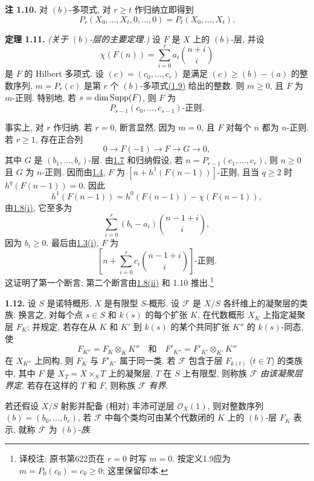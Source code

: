 \textbf{注 1.10.} 对 \((b)\)-多项式, 对 \(r\geq t\) 作归纳立即得到
\[
  P_r(X_0,\ldots,X_t,0,\ldots,0)=P_t(X_0,\ldots,X_t).
\]

\textbf{定理 1.11.} \emph{(关于 \((b)\)-层的主要定理.)} 设 \(F\) 是 \(X\) 上的 \((b)\)-层, 并设
\[
  \chi(F(n))=\sum_{i=0}^{r}a_i\binom{n+i}{i}
\]
是 \(F\) 的 Hilbert 多项式. 设 \((c)=(c_0,\ldots,c_r)\) 是满足 \((c)\geq(b)-(a)\) 的整数序列, \(m=P_r(c)\) 是第 \(r\) 个 \((b)\)-多项式\hyperlink{sga6.e13.def.1-9}{(1.9)} 给出的整数. 则 \(m\geq0\), 且 \(F\) 为 \(m\)-正则. 特别地, 若 \(s=\dim\operatorname{Supp}(F)\), 则 \(F\) 为
\[
  P_{s-1}(c_0,\ldots,c_{s-1})\text{-正则}.
\]

事实上, 对 \(r\) 作归纳. 若 \(r=0\), 断言显然, 因为 \(m=0\), 且 \(F\) 对每个 \(n\) 都为 \(n\)-正则. 若 \(r\geq1\), 存在正合列
\[
  0\longrightarrow F(-1)\longrightarrow F\longrightarrow G\longrightarrow0,
\]
其中 \(G\) 是 \((b_1,\ldots,b_r)\)-层. 由\hyperlink{sga6.e13.lem.1-7}{1.7} 和归纳假设, 若 \(n=P_{r-1}(c_1,\ldots,c_r)\), 则 \(n\geq0\) 且 \(G\) 为 \(n\)-正则. 因而由\hyperlink{sga6.e13.prop.1-4}{1.4}, \(F\) 为 \([n+h^1(F(n-1))]\)-正则, 且当 \(q\geq2\) 时 \(h^q(F(n-1))=0\). 因此
\[
  h^1(F(n-1))=h^0(F(n-1))-\chi(F(n-1)),
\]
由\hyperlink{sga6.e13.prop.1-8}{1.8(i)}, 它至多为
\[
  \sum_{i=0}^{r}(b_i-a_i)\binom{n-1+i}{i},
\]
因为 \(b_i\geq0\).
最后由\hyperlink{sga6.e13.prop.1-3}{1.3(i)}, \(F\) 为
\[
  \left[n+\sum_{i=0}^{r}c_i\binom{n-1+i}{i}\right]\text{-正则}.
\]
这证明了第一个断言; 第二个断言由\hyperlink{sga6.e13.prop.1-8}{1.8(ii)} 和 1.10 推出.\footnote{译校注: 原书第622页在 $r=0$ 时写 $m=0$. 按定义1.9应为 $m=P_0(c_0)=c_0\geq0$; 这里保留印本.}

\textbf{1.12.} 设 \(S\) 是诺特概形, \(X\) 是有限型 \(S\)-概形. 设 \(\mathcal F\) 是 \(X/S\) 各纤维上的凝聚层的类族. 换言之, 对每个点 \(s\in S\) 和 \(k(s)\) 的每个扩张 \(K\), 在代数概形 \(X_K\) 上指定凝聚层 \(F_K\); 并规定, 若存在从 \(K\) 和 \(K'\) 到 \(k(s)\) 的某个共同扩张 \(K''\) 的 \(k(s)\)-同态, 使
\[
  F_{K''}=F_K\otimes_KK''
  \quad\text{和}\quad
  F'_{K''}=F'_{K'}\otimes_{K'}K''
\]
在 \(X_{K''}\) 上同构, 则 \(F_K\) 与 \(F'_{K'}\) 属于同一类. 若 \(\mathcal F\) 包含于层 \(F_{k(t)}\) (\(t\in T\)) 的类族中, 其中 \(F\) 是 \(X_T=X\times_ST\) 上的凝聚层, \(T\) 在 \(S\) 上有限型, 则称族 \(\mathcal F\) \emph{由该凝聚层界定}. 若存在这样的 \(T\) 和 \(F\), 则称族 \(\mathcal F\) \emph{有界}.

若还假设 \(X/S\) 射影并配备 (相对) 丰沛可逆层 \(\mathcal O_X(1)\), 则对整数序列 \((b)=(b_0,\ldots,b_r)\), 若 \(\mathcal F\) 中每个类均可由某个代数闭的 \(K\) 上的 \((b)\)-层 \(F_K\) 表示, 就称 \(\mathcal F\) 为 \((b)\)-\emph{族}.

